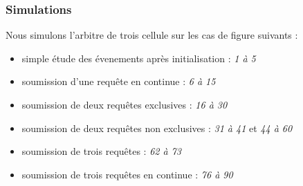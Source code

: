 \documentclass[a4paper]{article}
\begin{document}
\subsubsection{Simulations}
Nous simulons l'arbitre de trois cellule sur les cas de figure suivants : 
\begin{itemize}
\item simple étude des évenements après initialisation : \emph{1 à 5}
\item soumission d'une requête en continue : \emph{6 à 15}
\item soumission de deux requêtes exclusives : \emph{16 à 30}
\item soumission de deux requêtes non exclusives : \emph{31 à 41} et \emph{44 à 60}
\item soumission de trois requêtes : \emph{62 à 73}
\item soumission de trois requêtes en continue : \emph{76 à 90}
\end{itemize}

\vspace{10mm}



\section{}
\end{document}
